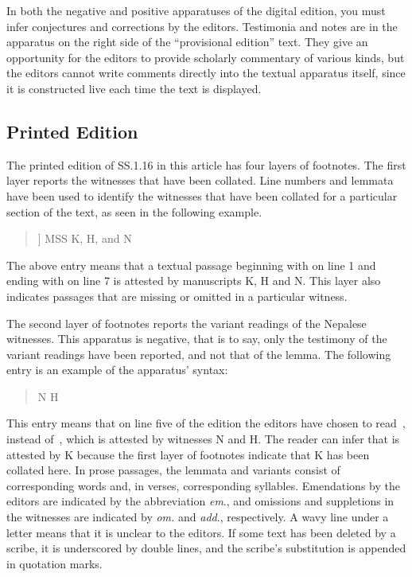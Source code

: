 In both the negative and positive apparatuses of the digital edition, you must
infer conjectures and corrections by the editors. Testimonia and notes are in the
apparatus on the right side of the “provisional edition” text.  They give an
opportunity for the editors to provide scholarly commentary of various kinds, but
the editors cannot write comments directly into the textual apparatus itself,
since it is constructed live each time the text is displayed.

\subsection{Printed Edition}

The printed edition of SS.1.16 in this article has four layers of footnotes. The
first layer reports the witnesses that have been collated. Line numbers and
lemmata have been used to identify the witnesses that have been collated for a
particular section of the text, as seen in the following example.
\begin{quote}
     ] MSS K, H, and N
\end{quote}
The above entry means that a textual passage beginning with  on line 1 and 
ending with  on line 7 is attested by manuscripts K, H and N. This layer 
also indicates passages that are missing or omitted in a particular witness. 

The second layer of footnotes reports the variant readings of the Nepalese witnesses. This 
apparatus is negative, that is to say, only the testimony of the variant readings have been 
reported, and not that of the lemma. The following entry is an example of the apparatus' 
syntax:
\begin{quote}
    \dev{5 pratanuṃ ]  pratanū} N H 
\end{quote}
This entry means that on line five of the edition the editors have chosen to read 
\,, instead of \,, which is attested by witnesses N and H. The 
reader can infer that  is attested by K because the first layer of footnotes 
indicate that K has been collated here. In prose passages, the lemmata and 
variants consist of corresponding words and, in verses, corresponding syllables. 
Emendations by the editors are indicated by the abbreviation \emph{em}., and omissions 
and suppletions in the witnesses are indicated by \emph{om.} and \emph{add}., 
respectively. A wavy line under a letter means that it is unclear to the editors. If some text 
has been deleted by a scribe, it is underscored by double lines, and the scribe's 
substitution is appended in quotation marks.  

